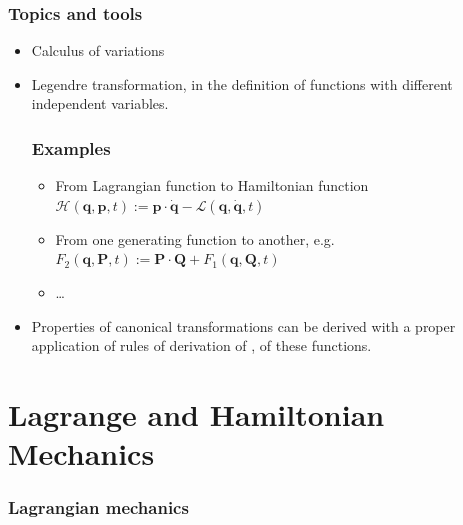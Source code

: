\documentclass[letterpaper,10pt,english]{jupyterBook}
\begin{document}
\subsubsection*{Topics and tools}
\begin{itemize}
\item {} 
\sphinxAtStartPar
Calculus of variations

\item {} 
\sphinxAtStartPar
Legendre transformation, in the definition of functions with different independent variables.
\subsubsection*{Examples}
\begin{itemize}
\item {} 
\sphinxAtStartPar
From Lagrangian function to Hamiltonian function \(\mathcal{H}(\mathbf{q}, \mathbf{p}, t) := \mathbf{p} \cdot \dot{\mathbf{q}} - \mathcal{L}(\mathbf{q}, \dot{\mathbf{q}},t)\)

\item {} 
\sphinxAtStartPar
From one generating function to another, e.g. \(F_2(\mathbf{q}, \mathbf{P}, t) := \mathbf{P} \cdot \mathbf{Q} + F_1(\mathbf{q}, \mathbf{Q}, t)\)

\item {} 
\sphinxAtStartPar
…

\end{itemize}

\item {} 
\sphinxAtStartPar
Properties of canonical transformations can be derived with a proper application of rules of derivation of ,  of these functions.

\end{itemize}


\section{Lagrange and Hamiltonian Mechanics}
\label{\detokenize{ch/quantum-mechanics/analytical-mechanics:lagrange-and-hamiltonian-mechanics}}\label{\detokenize{ch/quantum-mechanics/analytical-mechanics:quantum-mechanics-analytical-mechanics-lagrange-hamilton}}\subsubsection*{Lagrangian mechanics}
\end{document}
